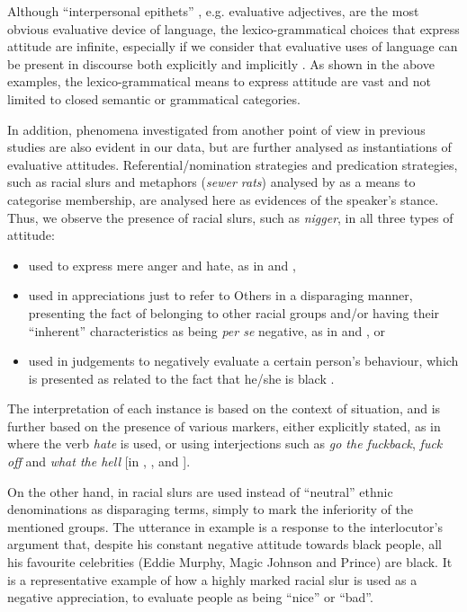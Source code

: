 \documentclass[output=paper]{LSP/langsci}
\begin{document}
Although “interpersonal epithets” \citep[see][376--377]{Halliday2014}, e.g. evaluative adjectives, are the most obvious evaluative device of language, the lexico-grammatical choices that express attitude are infinite, especially if we consider that evaluative uses of language can be present in discourse both explicitly and implicitly \citep[see][23] {Munday2012}. As shown in the above examples, the lexico-grammatical means to express attitude are vast and not limited to closed semantic or grammatical categories.

In addition, phenomena investigated from another point of view in previous studies are also evident in our data, but are further analysed as instantiations of evaluative attitudes. Referential/nomination strategies and predication strategies, such as racial slurs and metaphors (\textit{sewer rats}) analysed by \citet{Reisigl2001} as a means to categorise membership, are analysed here as evidences of the speaker's stance. Thus, we observe the presence of racial slurs, such as \textit{nigger}, in all three types of attitude:

\begin{itemize}
\item used to express mere anger and hate, as in  and ,
\item used in appreciations just to refer to Others in a disparaging manner, presenting the fact of belonging to other racial groups and/or having their “inherent” characteristics as being \textit{per se} negative, as in  and , or
\item used in judgements to negatively evaluate a certain person's behaviour, which is presented as related to the fact that he/she is black .
\end{itemize}

The interpretation of each instance is based on the context of situation, and is further based on the presence of various markers, either explicitly stated, as in  where the verb \textit{hate} is used, or using interjections such as \textit{go the fuckback}, \textit{fuck off} and \textit{what the hell} [in , , and ].

On the other hand, in  racial slurs are used instead of “neutral” ethnic denominations as disparaging terms, simply to mark the inferiority of the mentioned groups. The utterance in example  is a response to the interlocutor's argument that, despite his constant negative attitude towards black people, all his favourite celebrities (Eddie Murphy, Magic Johnson and Prince) are black. It is a representative example of how a highly marked racial slur is used as a negative appreciation, to evaluate people as being “nice” or “bad”.
\end{document}
